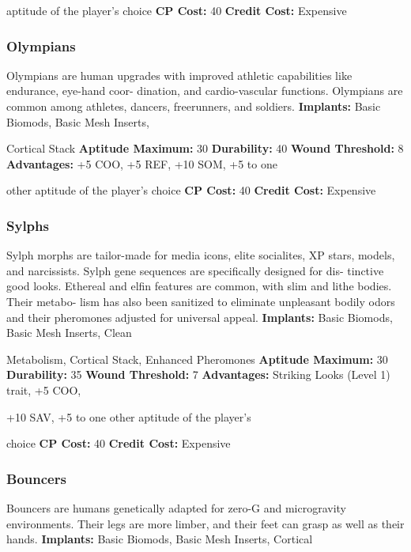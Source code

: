 aptitude of the player's choice
\textbf{CP Cost:} 40
\textbf{Credit Cost: }Expensive

\subsubsection{Olympians}

Olympians are human upgrades with improved 
athletic capabilities like endurance, eye-hand coor-
dination, and cardio-vascular functions. Olympians 
are common among athletes, dancers, freerunners, 
and soldiers.
\textbf{Implants: }Basic Biomods, Basic Mesh Inserts, 

Cortical Stack
\textbf{Aptitude Maximum: }30
\textbf{Durability: }40
\textbf{Wound Threshold: }8
\textbf{Advantages: }+5 COO, +5 REF, +10 SOM, +5 to one 

other aptitude of the player's choice
\textbf{CP Cost: }40
\textbf{Credit Cost: }Expensive

\subsubsection{Sylphs}

Sylph morphs are tailor-made for media icons, elite 
socialites, XP stars, models, and narcissists. Sylph 
gene sequences are specifically designed for dis-
tinctive good looks. Ethereal and elfin features are 
common, with slim and lithe bodies. Their metabo-
lism has also been sanitized to eliminate unpleasant 
bodily odors and their pheromones adjusted for 
universal appeal.
\textbf{Implants: }Basic Biomods, Basic Mesh Inserts, Clean 

Metabolism, Cortical Stack, Enhanced Pheromones
\textbf{Aptitude Maximum: }30
\textbf{Durability: }35
\textbf{Wound Threshold: }7
\textbf{Advantages: }Striking Looks (Level 1) trait, +5 COO, 

+10 SAV, +5 to one other aptitude of the player's 

choice
\textbf{CP Cost:} 40
\textbf{Credit Cost: }Expensive

\subsubsection{Bouncers}

Bouncers are humans genetically adapted for zero-G 
and microgravity environments. Their legs are more 
limber, and their feet can grasp as well as their hands.
\textbf{Implants: }Basic Biomods, Basic Mesh Inserts, Cortical 

